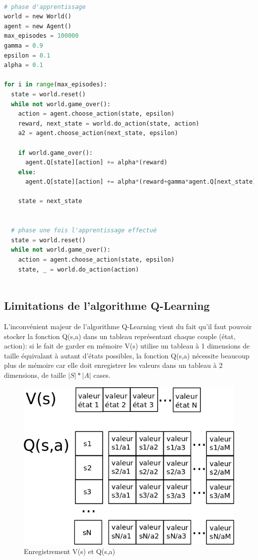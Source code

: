 \documentclass[11pt,a4paper]{report}
\begin{document}
   \begin{lstlisting}[language=python]
 
# phase d'apprentissage
world = new World()
agent = new Agent()
max_episodes = 100000
gamma = 0.9
epsilon = 0.1
alpha = 0.1
  
for i in range(max_episodes):
  state = world.reset()
  while not world.game_over():
    action = agent.choose_action(state, epsilon)
    reward, next_state = world.do_action(state, action)
    a2 = agent.choose_action(next_state, epsilon)
    
    if world.game_over(): 
      agent.Q[state][action] += alpha*(reward)
    else:
      agent.Q[state][action] += alpha*(reward+gamma*agent.Q[next_state][a2])

    state = next_state
    
        
  # phase une fois l'apprentissage effectué
  state = world.reset()
  while not world.game_over():
    action = agent.choose_action(state, epsilon)
    state, _ = world.do_action(action)
        
   \end{lstlisting} 
    
  \newpage
  \subsection{Limitations de l'algorithme Q-Learning}
    
    \par L'inconvénient majeur de l'algorithme Q-Learning vient du fait qu'il faut pouvoir stocker la fonction Q(s,a) dans un tableau représentant chaque couple (état, action): si le fait de garder en mémoire V(s) utilise un tableau à 1 dimensions de taille équivalant à autant d'états possibles, la fonction Q(s,a) nécessite beaucoup plus de mémoire car elle doit enregistrer les valeurs dans un tableau à 2 dimensions, de taille $|S| * |A|$ cases. 
    
    \begin{figure}[!h]
    \center
    \includegraphics[scale=0.45]{ressources/v_s_vs_q_sa.png}
    \caption{Enregistrement V(s) et Q(s,a)}
    \end{figure} 
    
\end{document}
